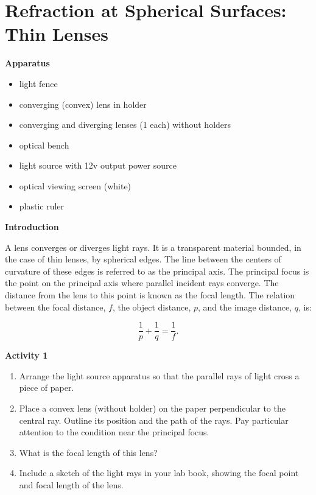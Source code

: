 \section{Refraction at Spherical Surfaces: Thin Lenses}

\makelabheader %

\medskip

\textbf{Apparatus}
\begin{itemize}[nosep]
\item light fence
\item converging (convex) lens in holder
\item converging and diverging lenses (1 each) without holders
\item optical bench 
\item light source with 12v output power source
\item optical viewing screen (white)
\item plastic ruler
\end{itemize}
\medskip


\textbf{Introduction} 

A lens converges or diverges light rays. It is a transparent material
bounded, in the case of thin lenses, by spherical edges. The line
between the centers of curvature of these edges is referred to as
the principal axis. The principal focus is the point on the principal
axis where parallel incident rays converge. The distance from the
lens to this point is known as the focal length. The relation between
the focal distance, $f$, the object distance, $p$, and the image distance,
$q$, is:

\begin{displaymath} \frac{1}{p} + \frac{1}{q} = \frac{1}{f}. \end{displaymath}


\textbf{Activity 1}

\begin{enumerate}[labparts]
\item Arrange the light source apparatus so that the parallel rays of light
cross a piece of paper. 

\item Place a convex lens (without holder) on the paper perpendicular to the central ray.
Outline its position and the path of the rays. Pay particular attention
to the condition near the principal focus.

\item What is the focal length of this lens?
\answerspace{20mm}

\item Include a sketch of the light rays in your lab book, showing the focal point and focal length of the lens.
\answerspace{35mm}
\end{enumerate}

